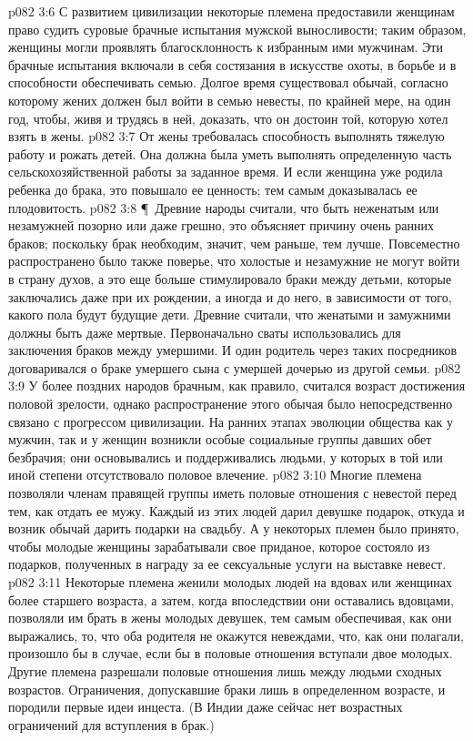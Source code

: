 \vs p082 3:6 С развитием цивилизации некоторые племена предоставили женщинам право судить суровые брачные испытания мужской выносливости; таким образом, женщины могли проявлять благосклонность к избранным ими мужчинам. Эти брачные испытания включали в себя состязания в искусстве охоты, в борьбе и в способности обеспечивать семью. Долгое время существовал обычай, согласно которому жених должен был войти в семью невесты, по крайней мере, на один год, чтобы, живя и трудясь в ней, доказать, что он достоин той, которую хотел взять в жены.
\vs p082 3:7 От жены требовалась способность выполнять тяжелую работу и рожать детей. Она должна была уметь выполнять определенную часть сельскохозяйственной работы за заданное время. И если женщина уже родила ребенка до брака, это повышало ее ценность; тем самым доказывалась ее плодовитость.
\vs p082 3:8 \P\ Древние народы считали, что быть неженатым или незамужней позорно или даже грешно, это объясняет причину очень ранних браков; поскольку брак необходим, значит, чем раньше, тем лучше. Повсеместно распространено было также поверье, что холостые и незамужние не могут войти в страну духов, а это еще больше стимулировало браки между детьми, которые заключались даже при их рождении, а иногда и до него, в зависимости от того, какого пола будут будущие дети. Древние считали, что женатыми и замужними должны быть даже мертвые. Первоначально сваты использовались для заключения браков между умершими. И один родитель через таких посредников договаривался о браке умершего сына с умершей дочерью из другой семьи.
\vs p082 3:9 У более поздних народов брачным, как правило, считался возраст достижения половой зрелости, однако распространение этого обычая было непосредственно связано с прогрессом цивилизации. На ранних этапах эволюции общества как у мужчин, так и у женщин возникли особые социальные группы давших обет безбрачия; они основывались и поддерживались людьми, у которых в той или иной степени отсутствовало половое влечение.
\vs p082 3:10 Многие племена позволяли членам правящей группы иметь половые отношения с невестой перед тем, как отдать ее мужу. Каждый из этих людей дарил девушке подарок, откуда и возник обычай дарить подарки на свадьбу. А у некоторых племен было принято, чтобы молодые женщины зарабатывали свое приданое, которое состояло из подарков, полученных в награду за ее сексуальные услуги на выставке невест.
\vs p082 3:11 Некоторые племена женили молодых людей на вдовах или женщинах более старшего возраста, а затем, когда впоследствии они оставались вдовцами, позволяли им брать в жены молодых девушек, тем самым обеспечивая, как они выражались, то, что оба родителя не окажутся невеждами, что, как они полагали, произошло бы в случае, если бы в половые отношения вступали двое молодых. Другие племена разрешали половые отношения лишь между людьми сходных возрастов. Ограничения, допускавшие браки лишь в определенном возрасте, и породили первые идеи инцеста. (В Индии даже сейчас нет возрастных ограничений для вступления в брак.)
